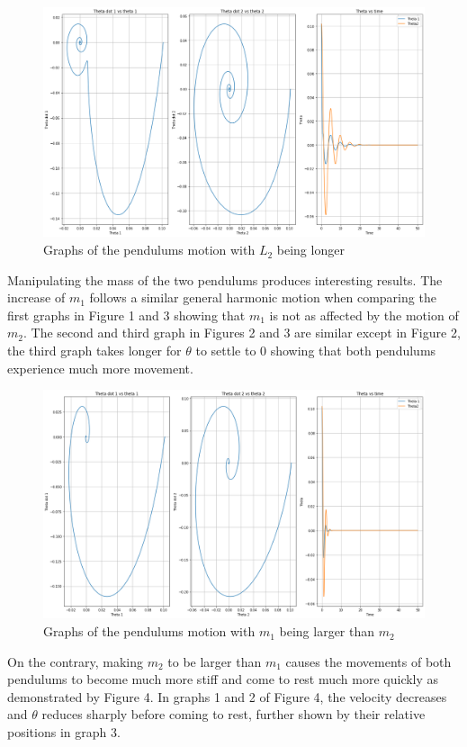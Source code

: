 \documentclass[linenumbers,RNAAS,trackchanges]{aastex631}
\begin{document}
\begin{figure}[H]
    \centering
    \centering
    \includegraphics[scale=.30]{l2.png}
    \caption{Graphs of the pendulums motion with $L_2$ being longer}
    \label{fig:code}
\end{figure}
Manipulating the mass of the two pendulums produces interesting results. The increase of $m_1$ follows a similar general harmonic motion when comparing the first graphs in Figure 1 and 3 showing that $m_1$ is not as affected by the motion of $m_2$. The second and third graph in Figures 2 and 3 are similar except in Figure 2, the third graph takes longer for $\theta$ to settle to 0 showing that both pendulums experience much more movement.
\begin{figure}[H]
    \centering
    \centering
    \includegraphics[scale=.30]{m1.png}
    \caption{Graphs of the pendulums motion with $m_1$ being larger than $m_2$}
    \label{fig:code}
\end{figure}
On the contrary, making $m_2$ to be larger than $m_1$ causes the movements of both pendulums to become much more stiff and come to rest much more quickly as demonstrated by Figure 4. In graphs 1 and 2 of Figure 4, the velocity decreases and $\theta$ reduces sharply before coming to rest, further shown by their relative positions in graph 3.
\end{document}
